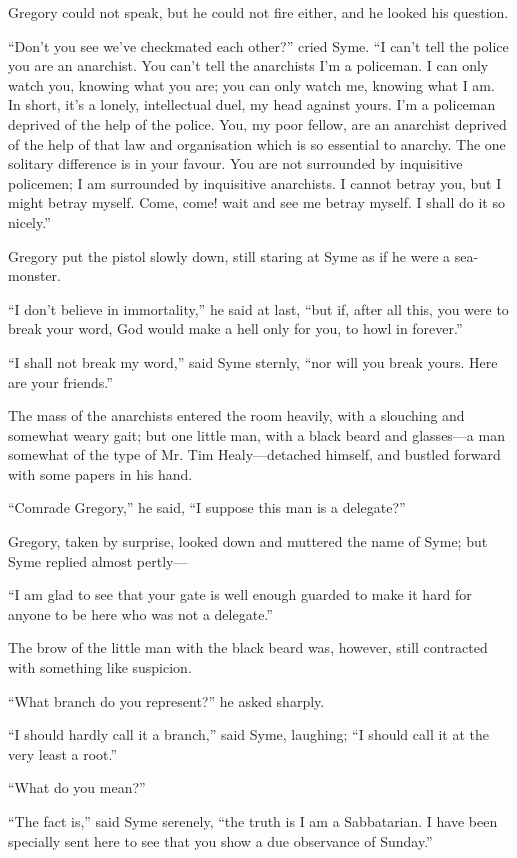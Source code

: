 Gregory could not speak, but he could not fire either, and he looked his question.

“Don’t you see we’ve checkmated each other?” cried Syme. “I can’t tell the police you are an anarchist. You can’t tell the anarchists I’m a policeman. I can only watch you, knowing what you are; you can only watch me, knowing what I am. In short, it’s a lonely, intellectual duel, my head against yours. I’m a policeman deprived of the help of the police. You, my poor fellow, are an anarchist deprived of the help of that law and organisation which is so essential to anarchy. The one solitary difference is in your favour. You are not surrounded by inquisitive policemen; I am surrounded by inquisitive anarchists. I cannot betray you, but I might betray myself. Come, come! wait and see me betray myself. I shall do it so nicely.”

Gregory put the pistol slowly down, still staring at Syme as if he were a sea-monster.

“I don’t believe in immortality,” he said at last, “but if, after all this, you were to break your word, God would make a hell only for you, to howl in forever.”

“I shall not break my word,” said Syme sternly, “nor will you break yours. Here are your friends.”

The mass of the anarchists entered the room heavily, with a slouching and somewhat weary gait; but one little man, with a black beard and glasses⁠—a man somewhat of the type of Mr. Tim Healy⁠—detached himself, and bustled forward with some papers in his hand.

“Comrade Gregory,” he said, “I suppose this man is a delegate?”

Gregory, taken by surprise, looked down and muttered the name of Syme; but Syme replied almost pertly⁠—

“I am glad to see that your gate is well enough guarded to make it hard for anyone to be here who was not a delegate.”

The brow of the little man with the black beard was, however, still contracted with something like suspicion.

“What branch do you represent?” he asked sharply.

“I should hardly call it a branch,” said Syme, laughing; “I should call it at the very least a root.”

“What do you mean?”

“The fact is,” said Syme serenely, “the truth is I am a Sabbatarian. I have been specially sent here to see that you show a due observance of Sunday.”

